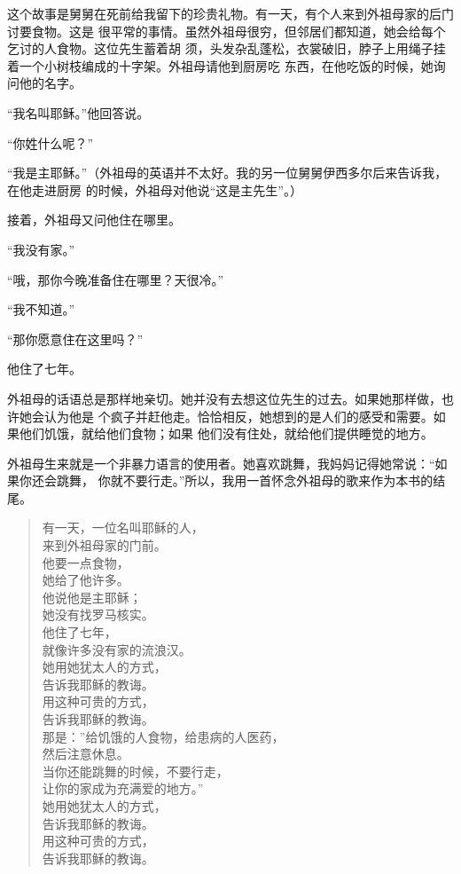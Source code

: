 \documentclass{ctexart}
\renewenvironment{quotation}{\setlength{\parskip}{0.5em}\setstretch{1.5}\kaishu\zihao{-5}\setlength{\parindent}{1em}}{\vspace{1em}}
\begin{document}
这个故事是舅舅在死前给我留下的珍贵礼物。有一天，有个人来到外祖母家的后门讨要食物。这是
很平常的事情。虽然外祖母很穷，但邻居们都知道，她会给每个乞讨的人食物。这位先生蓄着胡
须，头发杂乱蓬松，衣裳破旧，脖子上用绳子挂着一个小树枝编成的十字架。外祖母请他到厨房吃
东西，在他吃饭的时候，她询问他的名字。

\begin{quotation}
	``我名叫耶稣。''他回答说。

	``你姓什么呢？''

	``我是主耶稣。''（外祖母的英语并不太好。我的另一位舅舅伊西多尔后来告诉我，在他走进厨房
	的时候，外祖母对他说``这是主先生''。）
\end{quotation}

接着，外祖母又问他住在哪里。

\begin{quotation}
	``我没有家。''

	``哦，那你今晚准备住在哪里？天很冷。''

	``我不知道。''

	``那你愿意住在这里吗？''
\end{quotation}

他住了七年。

外祖母的话语总是那样地亲切。她并没有去想这位先生的过去。如果她那样做，也许她会认为他是
个疯子并赶他走。恰恰相反，她想到的是人们的感受和需要。如果他们饥饿，就给他们食物；如果
他们没有住处，就给他们提供睡觉的地方。

外祖母生来就是一个非暴力语言的使用者。她喜欢跳舞，我妈妈记得她常说：``如果你还会跳舞，
你就不要行走。''所以，我用一首怀念外祖母的歌来作为本书的结尾。

\begin{verse}
	有一天，一位名叫耶稣的人，\\
	来到外祖母家的门前。\\
	他要一点食物，\\
	她给了他许多。\\

	他说他是主耶稣；\\
	她没有找罗马核实。\\
	他住了七年，\\
	就像许多没有家的流浪汉。\\

	她用她犹太人的方式，\\
	告诉我耶稣的教诲。\\

	用这种可贵的方式，\\
	告诉我耶稣的教诲。\\
	那是：''给饥饿的人食物，给患病的人医药，\\
	然后注意休息。\\
	当你还能跳舞的时候，不要行走，\\
	让你的家成为充满爱的地方。''\\

	她用她犹太人的方式，\\
	告诉我耶稣的教诲。\\
	用这种可贵的方式，\\
	告诉我耶稣的教诲。
\end{verse}
\end{document}
